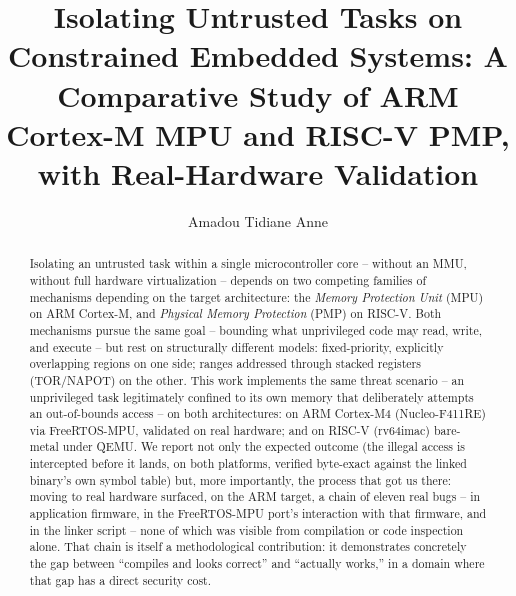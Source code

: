 \documentclass[sigconf,nonacm]{acmart}
\begin{document}
\title{Isolating Untrusted Tasks on Constrained Embedded Systems: A Comparative Study of ARM Cortex-M MPU and RISC-V PMP, with Real-Hardware Validation}

\author{Amadou Tidiane Anne}

\renewcommand{\shortauthors}{Anne}

\begin{abstract}
Isolating an untrusted task within a single microcontroller core -- without an MMU, without full hardware virtualization -- depends on two competing families of mechanisms depending on the target architecture: the \emph{Memory Protection Unit} (MPU) on ARM Cortex-M, and \emph{Physical Memory Protection} (PMP) on RISC-V. Both mechanisms pursue the same goal -- bounding what unprivileged code may read, write, and execute -- but rest on structurally different models: fixed-priority, explicitly overlapping regions on one side; ranges addressed through stacked registers (TOR/NAPOT) on the other. This work implements the same threat scenario -- an unprivileged task legitimately confined to its own memory that deliberately attempts an out-of-bounds access -- on both architectures: on ARM Cortex-M4 (Nucleo-F411RE) via FreeRTOS-MPU, validated on real hardware; and on RISC-V (rv64imac) bare-metal under QEMU. We report not only the expected outcome (the illegal access is intercepted before it lands, on both platforms, verified byte-exact against the linked binary's own symbol table) but, more importantly, the process that got us there: moving to real hardware surfaced, on the ARM target, a chain of eleven real bugs -- in application firmware, in the FreeRTOS-MPU port's interaction with that firmware, and in the linker script -- none of which was visible from compilation or code inspection alone. That chain is itself a methodological contribution: it demonstrates concretely the gap between ``compiles and looks correct'' and ``actually works,'' in a domain where that gap has a direct security cost.
\end{abstract}


\maketitle
\end{document}
